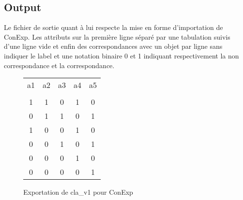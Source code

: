 \subsection*{Output}

Le fichier de sortie quant à lui respecte la mise en forme d'importation de ConExp. Les attributs sur la première ligne séparé par une tabulation suivis d'une ligne vide et enfin des correspondances avec un objet par ligne sans indiquer le label et une notation binaire \guillemotleft{} 0 \guillemotright{} et \guillemotleft{} 1 \guillemotright{} indiquant respectivement la non correspondance et la correspondance.

\begin{figure}[H]
	\begin{center}
		\begin{tabular}{ c c c c c }
			a1 & a2 & a3 & a4 & a5 \\
			\\
			1 & 1 & 0 & 1 & 0 \\
			0 & 1 & 1 & 0 & 1 \\
			1 & 0 & 0 & 1 & 0 \\
			0 & 0 & 1 & 0 & 1 \\
			0 & 0 & 0 & 1 & 0 \\
			0 & 0 & 0 & 0 & 1 \\
		\end{tabular}
	\end{center}
	\caption{Exportation de cla\_v1 pour ConExp}
\end{figure}
